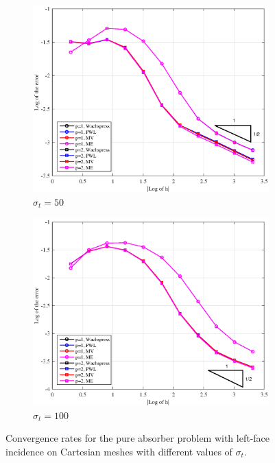 \begin{figure}
{}
\vspace{1cm}
{
	\begin{subfigure}[b]{0.485\textwidth}
		\centering
		\label{subfig::PA_Left_Cart_sig50}
		\includegraphics[width=\textwidth]{figures/sec_BF/PAErr_Left_Cart_sig50.eps}
	\caption{$\sigma_t = 50$}
	\end{subfigure}
	\hfill
	\begin{subfigure}[b]{0.485\textwidth}
		\centering
		\label{subfig::PA_Left_Cart_sig100}
		\includegraphics[width=\textwidth]{figures/sec_BF/PAErr_Left_Cart_sig100.eps}
	\caption{$\sigma_t = 100$}
	\end{subfigure}
}
\caption{Convergence rates for the pure absorber problem with left-face incidence on Cartesian meshes with different values of $\sigma_t$.}
\label{fig::BF_Results_PA_Left_Cart}
\end{figure}

